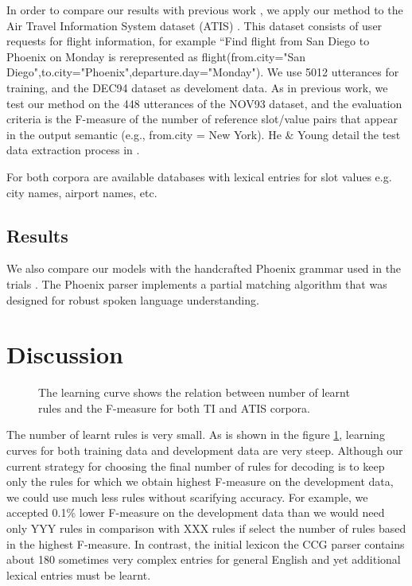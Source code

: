 \documentclass[11pt]{article}
\newcommand{\efgr}[2]{
  \begin{figure}[htbp]
    \makebox[8.5cm]{\framebox[5cm]{\rule{0pt}{5cm}}}
    \caption{#2}
    \label{#1}
  \end{figure}
}
\begin{document}
In order to compare our results with previous work \cite{he06,zettlemoyer07},
we apply our method to the Air Travel Information System dataset
(ATIS) \cite{atis94}. This dataset consists of user requests for flight information, for example ``Find flight from San Diego to Phoenix on Monday is rerepresented as flight(from.city="San Diego",to.city="Phoenix",departure.day="Monday"). We use 5012 utterances for training, and the DEC94 dataset as develoment data. As in previous work, we test our method on the 448 utterances of the NOV93 dataset, and the evaluation criteria is the F-measure of the number of reference slot/value pairs that appear in the output semantic (e.g., from.city = New York). He \& Young detail the test data extraction process in \cite{he05}.

For both corpora are available databases with lexical entries for slot values e.g. city names, airport names, etc. 

\subsection{Results}

We also compare our models with the handcrafted Phoenix grammar \cite{ward91} used in the trials \cite{williams07,thomson08}. The Phoenix parser implements a partial matching algorithm that was designed for robust spoken language understanding.

\section{Discussion}

\efgr{fig:learning:curve}{The learning curve shows the relation between number of learnt rules and the F-measure for both TI and ATIS corpora.}

The number of learnt rules is very small. As is shown in the figure \ref{fig:learning:curve}, learning curves for both training data and development data are very steep. Although our current strategy for choosing the final number of rules for decoding is to keep only the rules for which we obtain highest F-measure on the development data, we could use much less rules without scarifying accuracy. For example, we accepted 0.1\% lower F-measure on the development data than we would need only YYY rules in comparison with XXX rules if select the number of rules based in the highest F-measure. In contrast, the initial lexicon the CCG parser \cite{zettlemoyer07} contains about 180 sometimes very complex entries for general English and yet additional lexical entries must be learnt.
\end{document}
